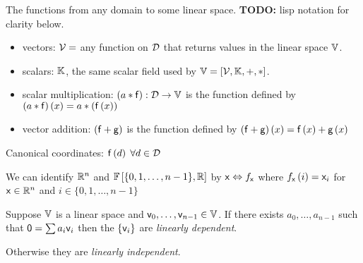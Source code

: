 \begin{example}
The functions from any domain to some linear space.
\textbf{TODO:} lisp notation for clarity below.
\begin{itemize}
  \item vectors: $\mathcal{V} = $ any function on $\mathcal{D}$
  that returns values in the linear space $\mathbb{V}$.
  \item scalars: $\mathbb{K}$, the same scalar field used by
  $\mathbb{V}=\left[ \mathcal{V}, \mathbb{K}, +, * \right]$.
  \item scalar multiplication:
  $ \left(a*\mathsf{f}\right) : \mathcal{D} \rightarrow \mathbb{V}$
  is the function defined by
   $ \left(a*\mathsf{f}\right) (x)
   = a*\left(\mathsf{f}\left( x \right) \right) $
  \item vector addition:
  $\left( \mathsf{f} + \mathsf{g} \right) $
  is the function defined by
  $\left( \mathsf{f} + \mathsf{g} \right) \left( x \right) =
  \mathsf{f} \left( x \right) + \mathsf{g} \left( x\right)$
\end{itemize}
Canonical coordinates: 
$\mathsf{f}\left( d \right) \; \forall d \in \mathcal{D}$
\end{example}

\begin{example}
We can identify 
$\mathbb{R}^n$ and 
$ \mathbb{F} \left[ \{ 0, 1, \ldots, {n-1} \}, \mathbb{R} \right] $
by
$\mathsf{x} \Leftrightarrow f_{\mathsf{x}}$
where $f_{\mathsf{x}} \left( i \right) = \mathsf{x}_i$
for $\mathsf{x} \in \mathbb{R}^n$ and 
$i \in \{ 0, 1, \ldots, {n-1} \}$
\end{example}

\begin{definition}
Suppose $\mathbb{V}$ is a linear space and
$\mathsf{v}_0, \ldots , \mathsf{v}_{n-1} \in \mathbb{V}$.
If there exists $a_0, \ldots , a_{n-1}$ such that
$\mathsf{0} = \sum a_i \mathsf{v}_i$ then the $\{ \mathsf{v}_i \}$
are \textit{linearly dependent}.
\cite[][section 5]{halmos-1958}

Otherwise they are \textit{linearly independent}.
\end{definition}

